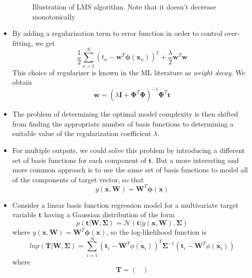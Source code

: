\documentclass[12pt, a4paper]{article}
\begin{document}
\begin{itemize}
\begin{figure}[htbp]
            \label{fig:LMS}
            \caption{Illustration of LMS algorithm. Note that it doesn't decrease monotonically}
        \end{figure}
        \item By adding a regularization term to error function in order to control over-fitting, we get
        \begin{equation*}
            \frac{1}{2}\sum_{n=1}^N(t_n-\bm{w}^T\bm{\phi}(\bm{x}_n))^2+\frac{\lambda}{2}\bm{w}^T\bm{w}
        \end{equation*}
        This choice of regularizer is known in the ML literature as \textit{weight decay}. We obtain
        \begin{equation}
            \bm{w}=(\lambda\bm{I}+\bm{\Phi}^T\bm{\Phi})^{-1}\bm{\Phi}^T\bm{t}
        \end{equation}
        \item The problem of determining the optimal model complexity is then shifted from finding the
        appropriate number of basis functions to determining a suitable value of the regularization 
        coefficient $\lambda$.
        \item For multiple outputs, we could solve this problem by introducing a different set of basis 
        functions for each component of $\bm{t}$. But a more interesting and more common approach is to 
        use the same set of basis functions to model all of the components of target vector, so that
        \begin{equation}
            y(\bm{x},\bm{W})=\bm{W}^T\bm{\phi}(\bm{x})
        \end{equation}
        \item Consider a linear basis function regression model for a multivariate target variable 
        $\bm{t}$ having a Gaussian distribution of the form
        \begin{equation}
            p(\bm{t}|\bm{W},\bm{\Sigma})=\mathcal{N}(\bm{t}|y(\bm{x},\bm{W}),\bm{\Sigma})
        \end{equation}
        where $y(\bm{x},\bm{W})=\bm{W}^T\bm{\phi}(\bm{x})$, so the log-likelihood function is 
        \begin{equation*}
            lnp(\bm{T}|\bm{W},\bm{\Sigma})=\sum_{i=1}^N(\bm{t}_i-\bm{W}^T\phi(\bm{x}_i))^T
            \bm{\Sigma}^{-1}(\bm{t}_i-\bm{W}^T\phi(\bm{x}_i))
        \end{equation*}
        where
        \begin{equation*}
            \bm{T}=\begin{pmatrix}

\end{pmatrix}
\end{equation*}
\end{itemize}
\end{document}

